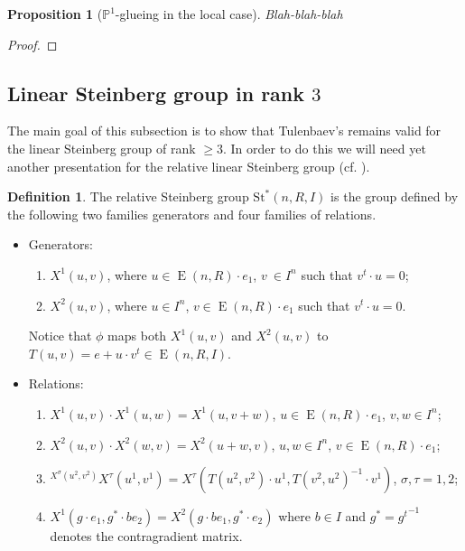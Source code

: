 \documentclass[oneside,12pt]{amsart}
\numberwithin{equation}{section}
\numberwithin{lem}{section}
\newtheorem{prop}[lem]{Proposition}
\theoremstyle{definition}
\newtheorem{dfn}[lem]{Definition}
\theoremstyle{remark}
\DeclareMathOperator{\EE}{E}
\newcommand{\Stb}{\mathrm{St}}
\newcommand{\Pro}{\mathbb{P}}
\begin{document}
\begin{prop}[$\Pro^1$-glueing in the local case] \label{prop:p1g} 
Blah-blah-blah 
\end{prop}
\begin{proof}
\end{proof}


\begin{appendices}

\section{Linear Steinberg group in rank $3$}

The main goal of this subsection is to show that Tulenbaev's \cite[Lemma~2.3]{Tu} remains valid for the linear Steinberg group of rank $\geq 3$.
In order to do this we will need yet another presentation for the relative linear Steinberg group (cf. \cite[Definitions~3.3 and 3.7]{S15}).
\begin{dfn}
 The relative Steinberg group $\Stb^*(n,R, I)$ is the group defined by the following two
 families generators and four families of relations.
 \begin{itemize}
  \item Generators:
  \begin{enumerate}
  \item $X^1(u, v)$, where $u \in \EE(n,R) \cdot e_1$, $v\ \in I^n$ such that $v^t \cdot u = 0$;
  \item $X^2(u, v)$, where $u \in I^n$, $v \in \EE(n,R) \cdot e_1$ such that $v^t \cdot u = 0$.
 \end{enumerate}
  Notice that $\phi$ maps both $X^1(u, v)$ and $X^2(u, v)$ to $T(u, v) = e + u \cdot v^t \in \EE(n, R, I)$.
  \item Relations:
  \begin{enumerate}
  \item $X^1(u, v) \cdot X^1(u, w) = X^1(u, v+w)$, $u \in \EE(n,R) \cdot e_1$, $v, w \in I^n$;
  \item $X^2(u, v) \cdot X^2(w, v) = X^2(u+w, v)$, $u, w \in I^n$, $v \in \EE(n,R) \cdot e_1$;
  \item ${}^{X^\sigma(u^2, v^2)} \! X^\tau(u^1, v^1) = X^\tau(T(u^2, v^2) \cdot u^1, T(v^2, u^2)^{-1} \cdot v^1)$, $\sigma, \tau = 1,2$;
  \item $X^1(g \cdot e_1, g^* \cdot be_2) = X^2(g \cdot be_1, g^* \cdot e_2)$ where $b\in I$ and $g^* = {g^t}^{-1}$ denotes the contragradient matrix.
 \end{enumerate}
 \end{itemize}
\end{dfn}


\end{appendices}
\end{document}
